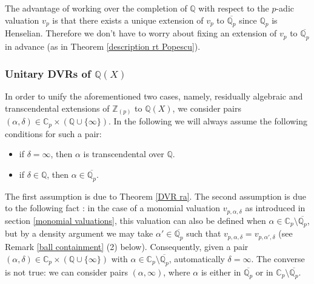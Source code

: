 \documentclass[10pt]{article}
\numberwithin{equation}{section}
\theoremstyle{definition}
\theoremstyle{definition}
\newcommand{\Q}{\mathbb{Q}}
\newcommand{\Z}{\mathbb{Z}}
\newcommand{\C}{\mathbb{C}}
\newcommand{\oQp}{\overline{\Q_p}}
\newcommand{\br}{\text{br}}
\newcommand\bc { \color{blue}}
\begin{document}
The advantage of working over the completion of $\Q$ with respect to the $p$-adic valuation $v_p$ is that there exists a unique extension of $v_p$ to $\oQp$ since $\Q_p$ is Henselian. Therefore we don't have to worry about fixing an extension of $v_p$ to $\oQp$ in advance (as in Theorem \ref{description rt Popescu}).



\subsubsection{Unitary DVRs of $\Q(X)$}\label{res tr}


In order to unify the aforementioned two cases, namely, residually algebraic 
and transcendental extensions of $\Z_{(p)}$ to $\Q(X)$, we consider  pairs $(\alpha,\delta)\in\C_p\times(\Q\cup\{\infty\})$. In the following we will always assume the following conditions for such a pair:
\begin{itemize}
    \item[-] if $\delta=\infty$, then $\alpha$ is transcendental over $\Q$. 
    \item[-] if $\delta\in\Q$, then $\alpha\in \oQp$.
\end{itemize}
The first assumption is due to Theorem \ref{DVR ra}. The second assumption is due to the following fact : in the case of a monomial valuation $v_{p,\alpha,\delta}$ as introduced in section \ref{monomial valuations}, this valuation can also be defined when $\alpha\in\C_p\setminus\oQp$, but by a density argument we may take $\alpha'\in \oQp$ such that $v_{p,\alpha,\delta}=v_{p,\alpha',\delta}$ (see Remark \ref{ball containment} (2) below). 
Consequently, given a pair $(\alpha,\delta)\in \C_p\times(\Q\cup\{\infty\})$ with $\alpha\in\C_p\setminus\oQp$, automatically $\delta=\infty$. The converse is not true: we can consider pairs $(\alpha,\infty)$, where $\alpha$ is either in $\oQp$ or in $\C_p\setminus\oQp$. 
\end{document}
